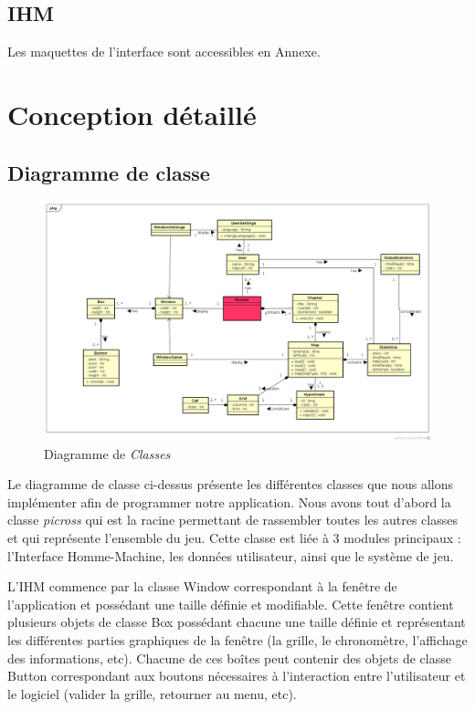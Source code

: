 \documentclass{report}
\begin{document}
  \section{IHM}
  
  Les maquettes de l'interface sont accessibles en Annexe.
  
  
			
\chapter{Conception détaillé}

    \section{Diagramme de classe}
    
    \begin{figure}[H]
	\caption{Diagramme de \textit{Classes}}
	\includegraphics[width=17cm]{../UML/Class_diagram/DiagrammeClasse.png}
    \end{figure}
    
    	
	Le diagramme de classe ci-dessus présente les différentes classes que nous allons implémenter afin de programmer notre application. Nous avons tout d’abord la classe \textit{picross} qui est la racine permettant de rassembler toutes les autres classes et qui représente l’ensemble du jeu. Cette classe est liée à 3 modules principaux : l’Interface Homme-Machine, les données utilisateur, ainsi que le système de jeu.

	L’IHM commence par la classe Window correspondant à la fenêtre de l’application et possédant une taille définie et modifiable. Cette fenêtre contient plusieurs objets de classe Box possédant chacune une taille définie et représentant les différentes parties graphiques de la fenêtre (la grille, le chronomètre, l’affichage des informations, etc). Chacune de ces boîtes peut contenir des objets de classe Button correspondant aux boutons nécessaires à l’interaction entre l’utilisateur et le logiciel (valider la grille, retourner au menu, etc).
\end{document}

